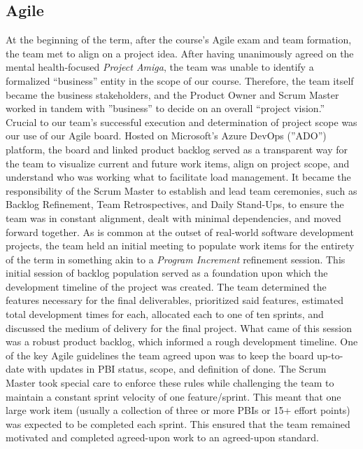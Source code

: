 \documentclass[10pt,american english]{article}
\begin{document}
\subsection*{Agile}
At the beginning of the term, after the course's Agile exam and team formation, the team met to align on a project idea. After having unanimously agreed on the mental health-focused \textit{Project Amiga}, the team was unable to identify a formalized ``business'' entity in the scope of our course. Therefore, the team itself became the business stakeholders, and the Product Owner and Scrum Master worked in tandem with ''business'' to decide on an overall ``project vision.''
\newline
\newline
Crucial to our team's successful execution and determination of project scope was our use of our Agile board. Hosted on Microsoft's Azure DevOps (''ADO'') platform, the board and linked product backlog served as a transparent way for the team to visualize current and future work items, align on project scope, and understand who was working what to facilitate load management. It became the responsibility of the Scrum Master to establish and lead team ceremonies, such as Backlog Refinement, Team Retrospectives, and Daily Stand-Ups, to ensure the team was in constant alignment, dealt with minimal dependencies, and moved forward together.
\newline
\newline
As is common at the outset of real-world software development projects, the team held an initial meeting to populate work items for the entirety of the term in something akin to a \textit{Program Increment} refinement session. This initial session of backlog population served as a foundation upon which the development timeline of the project was created. The team determined the features necessary for the final deliverables, prioritized said features, estimated total development times for each, allocated each to one of ten sprints, and discussed the medium of delivery for the final project. What came of this session was a robust product backlog, which informed a rough development timeline.
\newline
\newline
One of the key Agile guidelines the team agreed upon was to keep the board up-to-date with updates in PBI status, scope, and definition of done. The Scrum Master took special care to enforce these rules while challenging the team to maintain a constant sprint velocity of one feature/sprint. This meant that one large work item (usually a collection of three or more PBIs or 15+ effort points) was expected to be completed each sprint. This ensured that the team remained motivated and completed agreed-upon work to an agreed-upon standard.
\end{document}
